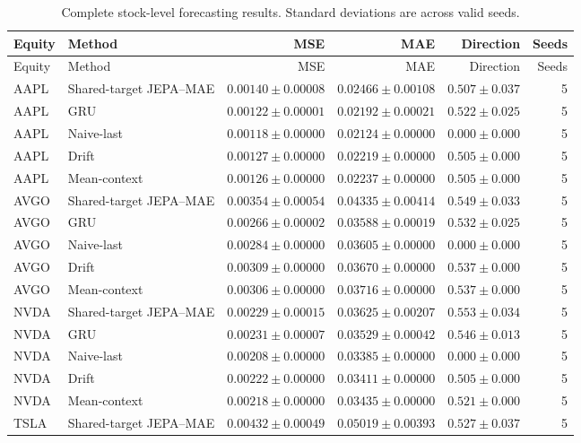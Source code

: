 \begin{longtable}{llrrrr}
\caption{Complete stock-level forecasting results. Standard deviations are across valid seeds.}\label{tab:appendix_stock_metrics}\\
\toprule
Equity & Method & MSE & MAE & Direction & Seeds \\
\midrule
\endfirsthead
\toprule
Equity & Method & MSE & MAE & Direction & Seeds \\
\midrule
\endhead
AAPL & Shared-target JEPA--MAE & $0.00140 \pm 0.00008$ & $0.02466 \pm 0.00108$ & $0.507 \pm 0.037$ & 5 \\
AAPL & GRU & $0.00122 \pm 0.00001$ & $0.02192 \pm 0.00021$ & $0.522 \pm 0.025$ & 5 \\
AAPL & Naive-last & $0.00118 \pm 0.00000$ & $0.02124 \pm 0.00000$ & $0.000 \pm 0.000$ & 5 \\
AAPL & Drift & $0.00127 \pm 0.00000$ & $0.02219 \pm 0.00000$ & $0.505 \pm 0.000$ & 5 \\
AAPL & Mean-context & $0.00126 \pm 0.00000$ & $0.02237 \pm 0.00000$ & $0.505 \pm 0.000$ & 5 \\
AVGO & Shared-target JEPA--MAE & $0.00354 \pm 0.00054$ & $0.04335 \pm 0.00414$ & $0.549 \pm 0.033$ & 5 \\
AVGO & GRU & $0.00266 \pm 0.00002$ & $0.03588 \pm 0.00019$ & $0.532 \pm 0.025$ & 5 \\
AVGO & Naive-last & $0.00284 \pm 0.00000$ & $0.03605 \pm 0.00000$ & $0.000 \pm 0.000$ & 5 \\
AVGO & Drift & $0.00309 \pm 0.00000$ & $0.03670 \pm 0.00000$ & $0.537 \pm 0.000$ & 5 \\
AVGO & Mean-context & $0.00306 \pm 0.00000$ & $0.03716 \pm 0.00000$ & $0.537 \pm 0.000$ & 5 \\
NVDA & Shared-target JEPA--MAE & $0.00229 \pm 0.00015$ & $0.03625 \pm 0.00207$ & $0.553 \pm 0.034$ & 5 \\
NVDA & GRU & $0.00231 \pm 0.00007$ & $0.03529 \pm 0.00042$ & $0.546 \pm 0.013$ & 5 \\
NVDA & Naive-last & $0.00208 \pm 0.00000$ & $0.03385 \pm 0.00000$ & $0.000 \pm 0.000$ & 5 \\
NVDA & Drift & $0.00222 \pm 0.00000$ & $0.03411 \pm 0.00000$ & $0.505 \pm 0.000$ & 5 \\
NVDA & Mean-context & $0.00218 \pm 0.00000$ & $0.03435 \pm 0.00000$ & $0.521 \pm 0.000$ & 5 \\
TSLA & Shared-target JEPA--MAE & $0.00432 \pm 0.00049$ & $0.05019 \pm 0.00393$ & $0.527 \pm 0.037$ & 5 \\

\end{longtable}
